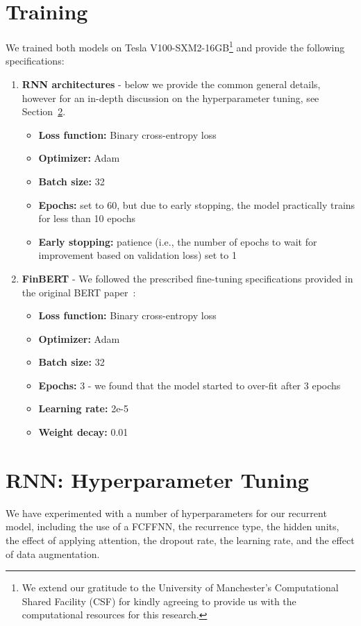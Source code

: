 \section{Training}\label{sec:training}
We trained both models on Tesla V100-SXM2-16GB\footnote{
    We extend our gratitude to the University of Manchester's Computational Shared Facility (CSF) for kindly agreeing to provide us with the computational resources for this research.
} and provide the following specifications:
\begin{enumerate}
    \item \textbf{RNN architectures} - below we provide the common general details, however for an in-depth discussion on the hyperparameter tuning, see Section~\ref{sec:hyperparameters}.
        \begin{itemize}
            \item \textbf{Loss function:} Binary cross-entropy loss
            \item \textbf{Optimizer:} Adam~\cite{kingma2017adam}
            \item \textbf{Batch size:} 32
            \item \textbf{Epochs:} set to 60, but due to early stopping, the model practically trains for less than 10 epochs
            \item \textbf{Early stopping:} patience (i.e., the number of epochs to wait for improvement based on validation loss) set to 1
        \end{itemize}
    \item \textbf{FinBERT} - We followed the prescribed fine-tuning specifications provided in the original BERT paper~\cite{devlin-etal-2019-bert}:
        \begin{itemize}
            \item \textbf{Loss function:} Binary cross-entropy loss
            \item \textbf{Optimizer:} Adam~\cite{kingma2017adam}
            \item \textbf{Batch size:} 32
            \item \textbf{Epochs:} 3 - we found that the model started to over-fit after 3 epochs
            \item \textbf{Learning rate:} 2e-5
            \item \textbf{Weight decay:} 0.01
        \end{itemize}
\end{enumerate}


\section{RNN: Hyperparameter Tuning}\label{sec:hyperparameters}
We have experimented with a number of hyperparameters for our recurrent model, including the use of a FCFFNN,
the recurrence type, the hidden units, the effect of applying attention, the dropout rate, the learning rate, and the effect of data augmentation.

